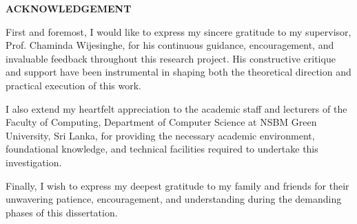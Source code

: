\thispagestyle{plain}
\begin{center}
    \vspace*{1cm}
    {\large \textbf{ACKNOWLEDGEMENT}\par}
    \vspace{1.5cm}
\end{center}

\noindent First and foremost, I would like to express my sincere gratitude to my supervisor, Prof. Chaminda Wijesinghe, for his continuous guidance, encouragement, and invaluable feedback throughout this research project. His constructive critique and support have been instrumental in shaping both the theoretical direction and practical execution of this work.

\vspace{0.5cm}

\noindent I also extend my heartfelt appreciation to the academic staff and lecturers of the Faculty of Computing, Department of Computer Science at NSBM Green University, Sri Lanka, for providing the necessary academic environment, foundational knowledge, and technical facilities required to undertake this investigation.

\vspace{0.5cm}

\noindent Finally, I wish to express my deepest gratitude to my family and friends for their unwavering patience, encouragement, and understanding during the demanding phases of this dissertation.
